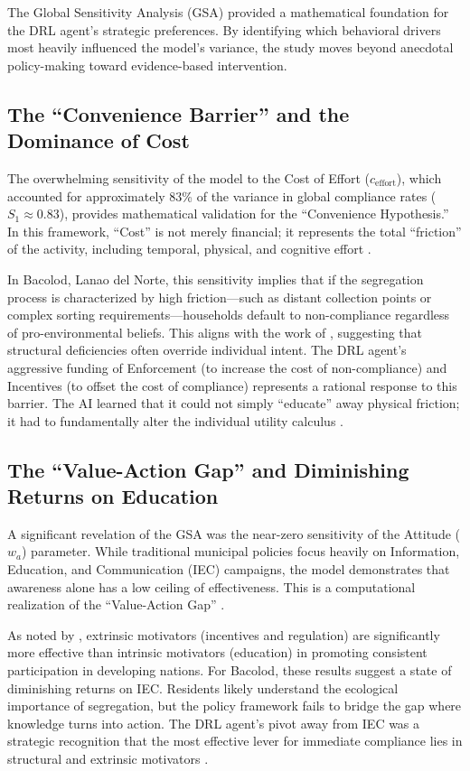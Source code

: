 The Global Sensitivity Analysis (GSA) provided a mathematical foundation for the DRL agent's strategic preferences. By identifying which behavioral drivers most heavily influenced the model's variance, the study moves beyond anecdotal policy-making toward evidence-based intervention.

\subsection{The ``Convenience Barrier'' and the Dominance of Cost}
The overwhelming sensitivity of the model to the Cost of Effort ($c_{\text{effort}}$), which accounted for approximately 83\% of the variance in global compliance rates ($S_1 \approx 0.83$), provides mathematical validation for the ``Convenience Hypothesis.'' In this framework, ``Cost'' is not merely financial; it represents the total ``friction'' of the activity, including temporal, physical, and cognitive effort \citep{Corcoran2020}. 

In Bacolod, Lanao del Norte, this sensitivity implies that if the segregation process is characterized by high friction---such as distant collection points or complex sorting requirements---households default to non-compliance regardless of pro-environmental beliefs. This aligns with the work of \citet{Yazawa2025}, suggesting that structural deficiencies often override individual intent. The DRL agent's aggressive funding of Enforcement (to increase the cost of non-compliance) and Incentives (to offset the cost of compliance) represents a rational response to this barrier. The AI learned that it could not simply ``educate'' away physical friction; it had to fundamentally alter the individual utility calculus \citep{Chen2023}.

\subsection{The ``Value-Action Gap'' and Diminishing Returns on Education}
A significant revelation of the GSA was the near-zero sensitivity of the Attitude ($w_a$) parameter. While traditional municipal policies focus heavily on Information, Education, and Communication (IEC) campaigns, the model demonstrates that awareness alone has a low ceiling of effectiveness. This is a computational realization of the ``Value-Action Gap'' \citep{Liao2024}. 

As noted by \citet{Zhao2022}, extrinsic motivators (incentives and regulation) are significantly more effective than intrinsic motivators (education) in promoting consistent participation in developing nations. For Bacolod, these results suggest a state of diminishing returns on IEC. Residents likely understand the ecological importance of segregation, but the policy framework fails to bridge the gap where knowledge turns into action. The DRL agent’s pivot away from IEC was a strategic recognition that the most effective lever for immediate compliance lies in structural and extrinsic motivators \citep{Badua2022}.

